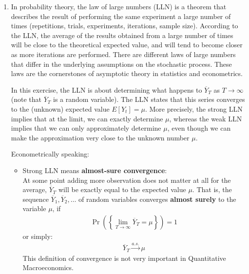 \begin{enumerate}

\item
In probability theory, the law of large numbers (LLN) is a theorem
  that describes the result of performing the same experiment a large number of times
  (repetitions, trials, experiments, iterations, sample size).
According to the LLN, the average of the results obtained from a large number of times
  will be close to the theoretical expected value,
  and will tend to become closer as more iterations are performed.
There are different laws of large numbers that differ in the underlying assumptions on the stochastic process.
These laws are the cornerstones of asymptotic theory in statistics and econometrics.

In this exercise, the LLN is about determining what happens to \(\overline{Y}_T\) as \(T\rightarrow\infty \)
  (note that \(\overline{Y}_T\) is a random variable).
The LLN states that this series converges to the (unknown) expected value \(E[Y_t] = \mu \).
More precisely, the strong LLN implies that at the limit, we can exactly determine \( \mu \),
  whereas the weak LLN implies that we can only approximately determine \( \mu \),
  even though we can make the approximation very close to the unknown number \( \mu \).

Econometrically speaking:
\begin{itemize}

\item
Strong LLN means \textbf{almost-sure convergence}:\\
At some point adding more observation does not matter at all for the average,
  \(\overline{Y}_T\) will be exactly equal to the expected value \(\mu \).
That is, the sequence \(\overline{Y}_{1},\overline{Y}_{2},\ldots \) of random variables
  converges \textbf{almost surely} to the variable \(\mu \), if
\begin{align*}
\Pr\left( \left \{ \lim_{T\rightarrow \infty }\overline{Y}_{T}=\mu\right \} \right) =1
\end{align*}
or simply:
\begin{align*}
\overline{Y}_{T}\overset{a.s.}{\rightarrow }\mu
\end{align*}
This definition of convergence is not very important in Quantitative Macroeconomics.


\end{itemize}
\end{enumerate}
